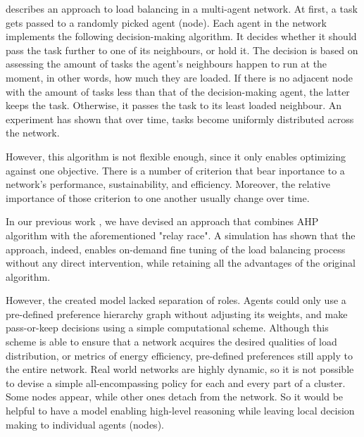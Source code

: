 \cite{gorodetskii-2012} describes an approach to load balancing in a multi-agent network.
At first, a task gets passed to a randomly picked agent (node).
Each agent in the network implements the following decision-making algorithm.
It decides whether it should pass the task further to one of its neighbours, or hold it.
The decision is based on assessing the amount of tasks the agent's neighbours happen to run at the moment, in other words, how much they are loaded.
If there is no adjacent node with the amount of tasks less than that of the decision-making agent, the latter keeps the task.
Otherwise, it passes the task to its least loaded neighbour.
An experiment has shown that over time, tasks become uniformly distributed across the network.

However, this algorithm is not flexible enough, since it only enables optimizing against one objective.
There is a number of criterion that bear inportance to a network's performance, sustainability, and efficiency.
Moreover, the relative importance of those criterion to one another usually change over time.

In our previous work \cite{murashov-2022}, we have devised an approach that combines AHP algorithm with the aforementioned "relay race".
A simulation has shown that the approach, indeed, enables on-demand fine tuning of the load balancing process without any direct intervention, while retaining all the advantages of the original algorithm.

However, the created model lacked separation of roles.
Agents could only use a pre-defined preference hierarchy graph without adjusting its weights, and make pass-or-keep decisions using a simple computational scheme.
Although this scheme is able to ensure that a network acquires the desired qualities of load distribution, or metrics of energy efficiency, pre-defined preferences still apply to the entire network.
Real world networks are highly dynamic, so it is not possible to devise a simple all-encompassing policy for each and every part of a cluster.
Some nodes appear, while other ones detach from the network.
So it would be helpful to have a model enabling high-level reasoning while leaving local decision making to individual agents (nodes).

